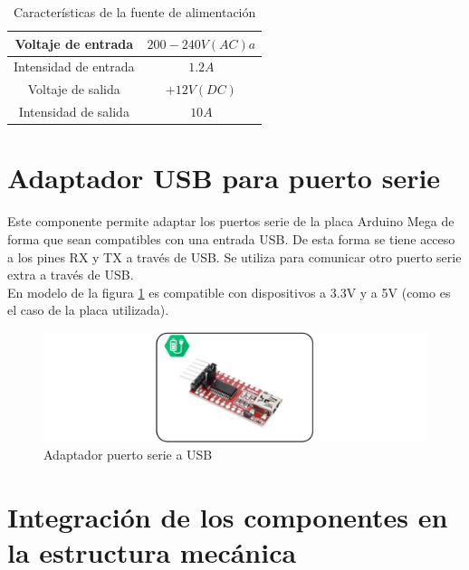 	\begin{table}[H]
      	\caption{Características de la fuente de alimentación}
      	\label{tab:fuente}
      	\begin{center}
      		\begin{tabular}{ |c|c| }
      			\hline
      			Voltaje de entrada & $200-240 V(AC)a$  \\
      			\hline
      			Intensidad de entrada & $1.2A$\\
      			\hline
      			Voltaje de salida & $+12V(DC)$  \\
      			\hline
      			Intensidad de salida & $10A$  \\
      			\hline
      		\end{tabular}
      	\end{center}
	\end{table}
	
\section{Adaptador USB para puerto serie}
	Este componente permite adaptar los puertos serie de la placa Arduino Mega de forma que sean compatibles con una entrada USB. De esta forma se tiene acceso a los pines RX y TX a través de USB. Se utiliza para comunicar otro puerto serie extra a través de USB.
	\\
	
	En modelo de la figura \ref{fig:Electronica:ftdi} es compatible con dispositivos a 3.3V y a 5V (como es el caso de la placa utilizada).
	\begin{figure}[H]
		\centering
		\includegraphics[width=\textwidth]{figuras/Imagenes_Electronica/adaptador_ftdi.jpg}
		\caption{Adaptador puerto serie a USB}
		\label{fig:Electronica:ftdi}
	\end{figure}
\section{Integración de los componentes en la estructura mecánica} \label{sec:Electronica:Integracion}

